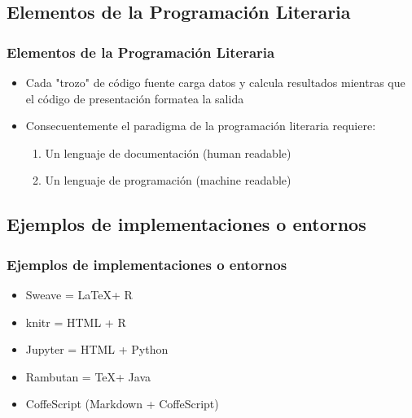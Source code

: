 \documentclass[sans serif,9pt,xcolor=dvipsnames]{beamer}%
\begin{document}
\subsection{Elementos de la Programación Literaria}
\begin{frame}
  \frametitle{Elementos de la Programación Literaria}
\begin{itemize}
\justifying
\item Cada "trozo" de código fuente carga datos y calcula resultados mientras que el código de presentación formatea la salida
\bigskip
 \item Consecuentemente el paradigma de la programación literaria requiere: 
\begin{enumerate}
\item Un lenguaje de documentación (human readable)
\item Un lenguaje de programación (machine readable)
\end{enumerate}
\end{itemize}
\end{frame}

\subsection{Ejemplos de implementaciones o entornos}
\begin{frame}
  \frametitle{Ejemplos de implementaciones o entornos}
\begin{itemize}
\justifying
\item Sweave = \LaTeX + R
\bigskip
\item  knitr = HTML + R
\bigskip
\item  Jupyter = HTML + Python
\bigskip
\item  Rambutan = \TeX + Java
\bigskip
\item  CoffeScript (Markdown + CoffeScript)
\end{itemize}
\end{frame}
\end{document}
